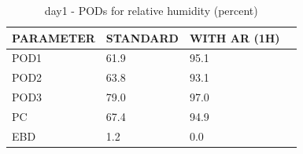 \begin{table}[p!]
\begin{center}
\begin{tabular}{|l|l|l|l|}
\hline
\multicolumn{1}{|c|}{\cellcolor[HTML]{C0C0C0}\textbf{PARAMETER}} & \multicolumn{1}{c|}{\cellcolor[HTML]{C0C0C0}\textbf{STANDARD}} & \multicolumn{1}{c|}{\cellcolor[HTML]{C0C0C0}\textbf{WITH AR (1H)}} \\
\hline
\cellcolor[HTML]{C0C0C0}POD1  & 61.9                                & 95.1         \\
\cellcolor[HTML]{C0C0C0}POD2  & 63.8                                & 93.1         \\
\cellcolor[HTML]{C0C0C0}POD3  & 79.0                                & 97.0         \\
\cellcolor[HTML]{C0C0C0}PC    & 67.4                                  & 94.9           \\
\cellcolor[HTML]{C0C0C0}EBD   & 1.2                                 & 0.0          \\
\hline
\end{tabular}
\caption{day1 - PODs for relative humidity (percent)}
\label{tab:podrh:day1}
\end{center}
\end{table}

